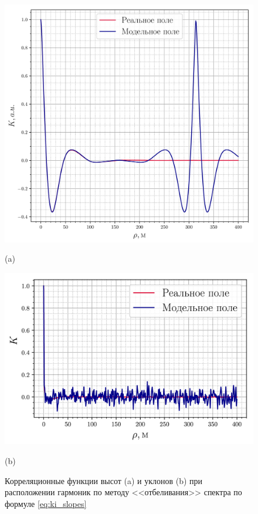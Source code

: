 \begin{figure}[ht]
    \centering
    \begin{minipage}{0.49\linewidth}
        \centering
        \includegraphics[width=\linewidth]{fig/correlation_height5_slopes2.png}

        (a)
    \end{minipage}
    \begin{minipage}{0.49\linewidth}
        \centering
        \includegraphics[width=\linewidth]{fig/correlation_angles_slopes2.png}

        (b)


    \end{minipage}
    \caption{ Корреляционные функции высот (a) и уклонов (b) при расположении гармоник
    по методу <<отбеливания>> спектра по формуле \eqref{eq:ki_slopes} }
    \label{fig:ki_slopes}
\end{figure}

